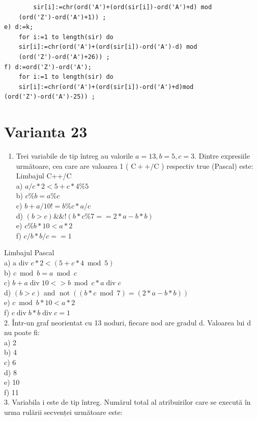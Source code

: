\documentclass[10pt]{article}
\begin{document}
\begin{verbatim}
        sir[i]:=chr(ord('A')+(ord(sir[i])-ord('A')+d) mod
    (ord('Z')-ord('A')+1)) ;
e) d:=k;
    for i:=1 to length(sir) do
    sir[i]:=chr(ord('A')+(ord(sir[i])-ord('A')-d) mod
    (ord('Z')-ord('A')+26)) ;
f) d:=ord('Z')-ord('A');
    for i:=1 to length(sir) do
    sir[i]:=chr(ord('A')+(ord(sir[i])-ord('A')+d)mod
(ord('Z')-ord('A')-25)) ;
\end{verbatim}

\section*{Varianta 23}
\begin{enumerate}
  \item Trei variabile de tip întreg au valorile $a=13, b=5, c=3$. Dintre expresiile următoare, cea care are valoarea 1 ( $\mathrm{C}++/ \mathrm{C}$ ) respectiv true (Pascal) este:\\
Limbajul C++/C\\
a) $a / c * 2<5+c * 4 \% 5$\\
b) $c \% b=a \% c$\\
c) $b+a / 10!=b \% c * a / c$\\
d) $(b>c) \& \&!(b * c \% 7==2 * a-b * b)$\\
e) $c \% b * 10<a * 2$\\
f) $c / b * b / c==1$
\end{enumerate}

Limbajul Pascal\\
a) a div $c * 2<(5+c * 4 \bmod 5)$\\
b) $c \bmod b=a \bmod c$\\
c) $b+a \operatorname{div} 10<>b \bmod c * a \operatorname{div} c$\\
d) $(b>c)$ and $\operatorname{not}((b * c \bmod 7)=(2 * a-b * b))$\\
e) $c \bmod b * 10<a * 2$\\
f) $c \operatorname{div} b * b \operatorname{div} c=1$\\
2. Într-un graf neorientat cu 13 noduri, fiecare nod are gradul d. Valoarea lui d nu poate fi:\\
a) 2\\
b) 4\\
c) 6\\
d) 8\\
e) 10\\
f) 11\\
3. Variabila i este de tip întreg. Numărul total al atribuirilor care se execută în urma rulării secvenței următoare este:
\end{document}
